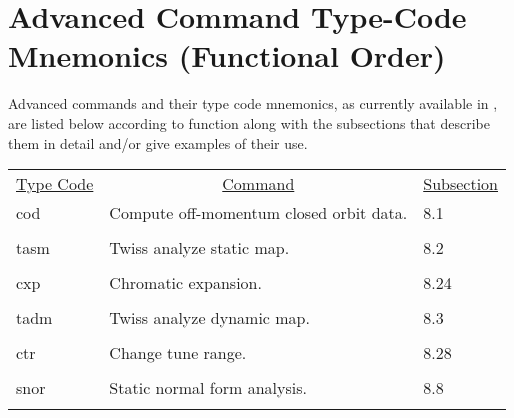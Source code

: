 \newpage
\section[Advanced Command Type-Code $\cdots$
(Functional Order)]{Advanced Command Type-Code Mnemonics \protect\newline (Functional Order)}
     Advanced commands and their type code mnemonics, as currently
available in , are listed below according to function along with
the subsections that describe them in detail and/or give examples of their
use.
\begin{center}
\begin{tabular}{lll}
\multicolumn{1}{c}{\underline {Type Code}} &
\multicolumn{1}{c}{\underline{Command}}   &
\multicolumn{1}{c}{\underline{Subsection}} \\
\hspace{1.5em}cod     &   Compute off-momentum closed orbit data.  & \hspace{2em}8.1\\
\vspace{-3mm}& &\\
\hspace{1.5em}tasm    &           Twiss analyze static map.      &  \hspace{2em}8.2\\
\vspace{-3mm}& &\\
\hspace{1.5em}cxp  & Chromatic expansion. & \hspace{2em}8.24\\
\vspace{-3mm}& &\\
\hspace{1.5em}tadm    &           Twiss analyze dynamic map.     &  \hspace{2em}8.3\\
\vspace{-3mm}& &\\
\hspace{1.5em}ctr     &           Change tune range.         &   \hspace{2em}8.28\\
\vspace{-3mm}& &\\
\hspace{1.5em}snor    &           Static normal form analysis.   &  \hspace{2em}8.8\\
\vspace{-3mm}& &\\

\end{tabular}
\end{center}
